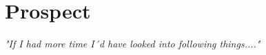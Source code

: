 \chapter{Prospect} %
\label{Chapter8}


\textit{"If I had more time I´d have looked into following things...."}



